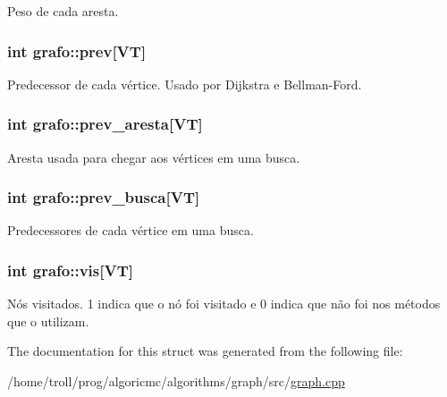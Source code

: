 \label{structgrafo_a9b7c937f400c11fbaabeee69f5bb8d05}
Peso de cada aresta. \hypertarget{structgrafo_ae3d3ff234ff61762daac88fc09c15052}{
\subsubsection[{prev}]{\setlength{\rightskip}{0pt plus 5cm}int {\bf grafo::prev}\mbox{[}{\bf VT}\mbox{]}}}
\label{structgrafo_ae3d3ff234ff61762daac88fc09c15052}
Predecessor de cada vértice. Usado por Dijkstra e Bellman-\/Ford. \hypertarget{structgrafo_af1366a8328922dd40543a4adf73ad92a}{
\subsubsection[{prev\_\-aresta}]{\setlength{\rightskip}{0pt plus 5cm}int {\bf grafo::prev\_\-aresta}\mbox{[}{\bf VT}\mbox{]}}}
\label{structgrafo_af1366a8328922dd40543a4adf73ad92a}
Aresta usada para chegar aos vértices em uma busca. \hypertarget{structgrafo_aad10cbd81087dd567b2ec3146e515748}{
\subsubsection[{prev\_\-busca}]{\setlength{\rightskip}{0pt plus 5cm}int {\bf grafo::prev\_\-busca}\mbox{[}{\bf VT}\mbox{]}}}
\label{structgrafo_aad10cbd81087dd567b2ec3146e515748}
Predecessores de cada vértice em uma busca. \hypertarget{structgrafo_adf60afc6ee1e48ca29afe8f5574841d9}{
\subsubsection[{vis}]{\setlength{\rightskip}{0pt plus 5cm}int {\bf grafo::vis}\mbox{[}{\bf VT}\mbox{]}}}
\label{structgrafo_adf60afc6ee1e48ca29afe8f5574841d9}
Nós visitados. 1 indica que o nó foi visitado e 0 indica que não foi nos métodos que o utilizam. 

The documentation for this struct was generated from the following file:\begin{DoxyCompactItemize}
\item 
/home/troll/prog/algoricmc/algorithms/graph/src/\hyperlink{graph_8cpp}{graph.cpp}\end{DoxyCompactItemize}
